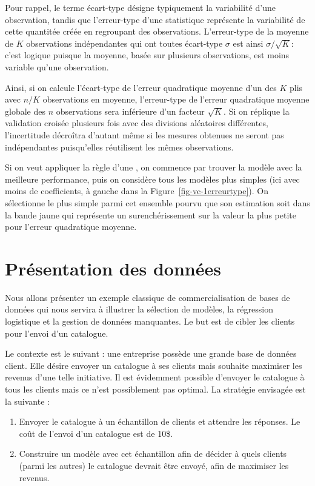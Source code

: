 \documentclass[
  11pt,
  letterpaper,
]{scrbook}
\providecommand{\tightlist}{%
  \setlength{\itemsep}{0pt}\setlength{\parskip}{0pt}}\usepackage{longtable,booktabs,array}
\theoremstyle{definition}
\theoremstyle{remark}
\begin{document}
Pour rappel, le terme écart-type désigne typiquement la variabilité
d'une observation, tandis que l'erreur-type d'une statistique représente
la variabilité de cette quantitée créée en regroupant des observations.
L'erreur-type de la moyenne de \(K\) observations indépendantes qui ont
toutes écart-type \(\sigma\) est ainsi \(\sigma/\sqrt{K}\): c'est
logique puisque la moyenne, basée sur plusieurs observations, est moins
variable qu'une observation.

Ainsi, si on calcule l'écart-type de l'erreur quadratique moyenne d'un
des \(K\) plis avec \(n/K\) observations en moyenne, l'erreur-type de
l'erreur quadratique moyenne globale des \(n\) observations sera
inférieure d'un facteur \(\sqrt{K}\). Si on réplique la validation
croisée plusieurs fois avec des divisions aléatoires différentes,
l'incertitude décroîtra d'autant même si les mesures obtenues ne seront
pas indépendantes puisqu'elles réutilisent les mêmes observations.

Si on veut appliquer la règle d'une , on commence par trouver la modèle
avec la meilleure performance, puis on considère tous les modèles plus
simples (ici avec moins de coefficients, à gauche dans la
Figure~\ref{fig-vc-1erreurtype}). On sélectionne le plus simple parmi
cet ensemble pourvu que son estimation soit dans la bande jaune qui
représente un surenchérissement sur la valeur la plus petite pour
l'erreur quadratique moyenne.

\hypertarget{pruxe9sentation-des-donnuxe9es}{%
\section{Présentation des
données}\label{pruxe9sentation-des-donnuxe9es}}

Nous allons présenter un exemple classique de commercialisation de bases
de données qui nous servira à illustrer la sélection de modèles, la
régression logistique et la gestion de données manquantes. Le but est de
cibler les clients pour l'envoi d'un catalogue.

Le contexte est le suivant : une entreprise possède une grande base de
données client. Elle désire envoyer un catalogue à ses clients mais
souhaite maximiser les revenus d'une telle initiative. Il est évidemment
possible d'envoyer le catalogue à tous les clients mais ce n'est
possiblement pas optimal. La stratégie envisagée est la suivante :

\begin{enumerate}
\def\labelenumi{\arabic{enumi}.}
\tightlist
\item
  Envoyer le catalogue à un échantillon de clients et attendre les
  réponses. Le coût de l'envoi d'un catalogue est de 10\$.
\item
  Construire un modèle avec cet échantillon afin de décider à quels
  clients (parmi les autres) le catalogue devrait être envoyé, afin de
  maximiser les revenus.
\end{enumerate}
\end{document}
